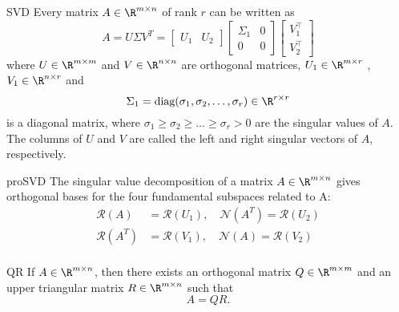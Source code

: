 \begin{theo}{SVD}
    Every matrix $A \in \R^{m \times n}$ of rank $r$ can be written as
    \begin{equation*}
        A = U \Sigma V^T = \left[
            \begin{array}{cc}
            U_1 & U_2
            \end{array}
            \right]
            \left[
            \begin{array}{cc}
            \Sigma_1 & 0 \\
            0 & 0
            \end{array}
            \right]
            \left[
            \begin{array}{c}
            V_1^\top \\
            V_2^\top
            \end{array}
            \right]
    \end{equation*}
    where $U \in \R^{m \times m}$ and $V \in \R^{n \times n}$ are orthogonal matrices, $U_1 \in \R^{m \times r}$ , $V_1 \in \R^{n \times r}$ and 
    \begin{equation*}
        \Sigma_1 = \text{diag}(\sigma_1, \sigma_2, \ldots, \sigma_r) \in \R^{r \times r}
    \end{equation*}
    is a diagonal matrix, where $\sigma_1 \geq \sigma_2 \geq \ldots \geq \sigma_r > 0$ are the singular values of $A$. The columns of $U$ and $V$ are called the left and right singular vectors of $A$, respectively.
\end{theo}

\begin{pro}{proSVD}
    The singular value decomposition of a matrix $A \in \R^{m \times n}$ gives orthogonal bases for the four fundamental subspaces related to A:
    \begin{align*}
        \mathcal{R}(A) &= \mathcal{R}(U_1), \quad \mathcal{N}(A^T) = \mathcal{R}(U_2) \\
        \mathcal{R}(A^T) &= \mathcal{R}(V_1), \quad \mathcal{N}(A) = \mathcal{R}(V_2) \\
    \end{align*}
    \vspace{-1cm}
\end{pro}

\begin{theo}{QR}
    If $A \in \R^{m \times n}$, then there exists an orthogonal matrix $Q \in \R^{m \times m}$ and an upper triangular matrix $R \in \R^{m \times n}$ such that
    \begin{equation*}
        A = QR.
    \end{equation*}
    \vspace{-0.5cm}
\end{theo}

